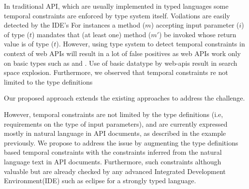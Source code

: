 
In traditional API, which are usually implemented in typed languages some temporal constraints are enforced by type system itself.
Voilations are easily detected by the IDE's
For instances a method ($m$) accepting input parameter ($i$) of type ($t$) mandates
that (at least one) method ($m'$) be invoked whose return value is of type ($t$).
However, using type system to detect temporal constraints in context of web APIs will result
in a lot of false positives as web APIs work only on basic types such as
 and .
Use of basic datatype by web-apis result in search space explosion.
Furthermore, we observed that temporal constraints re not limited to the type definitions
 
Our proposed approach extends the existing approaches to address the challenge.

However, temporal constraints are not limited by the type definitions
(i.e, requirements on the type of input parameters),
and are currently expressed mostly in natural language in API documents,
as described in the example previously.
We propose to address the issue by augmenting the type definitions based temporal constraints
with the constraints inferred from the natural language text in API documents.
Furthermore, such constraints although valuable but are already checked by any advanced 
Integrated Development Environment(IDE) such as eclipse for a strongly typed language. 

